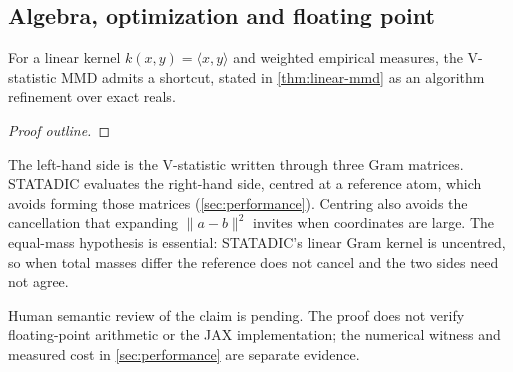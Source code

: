\subsection{Algebra, optimization and floating point}

For a linear kernel $k(x, y) = \langle x, y \rangle$ and weighted empirical
measures, the V-statistic MMD admits a shortcut, stated in
\cref{thm:linear-mmd} as an algorithm refinement over exact reals.

\begin{theorem}\label{thm:linear-mmd}
\end{theorem}
\begin{proof}[Proof outline]
\end{proof}

The left-hand side is the V-statistic written through three Gram matrices.
STATADIC evaluates the right-hand side, centred at a reference atom, which avoids
forming those matrices (\cref{sec:performance}). Centring also avoids the
cancellation that expanding $\lVert a - b \rVert^2$ invites when coordinates
are large. The equal-mass hypothesis is essential: STATADIC's linear Gram kernel
is uncentred, so when total masses differ the reference does not cancel and
the two sides need not agree.

Human semantic review of the claim is pending. The proof does not verify
floating-point arithmetic or the JAX implementation; the numerical witness and
measured cost in \cref{sec:performance} are separate evidence.
